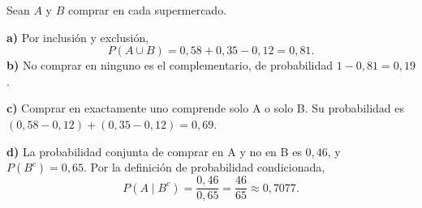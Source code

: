 Sean $A$ y $B$ comprar en cada supermercado.

\textbf{a)} Por inclusión y exclusión,
\[
 P(A\cup B)=0{,}58+0{,}35-0{,}12=\boxed{0{,}81}.
\]
\textbf{b)} No comprar en ninguno es el complementario, de probabilidad $1-0{,}81=\boxed{0{,}19}$.

\textbf{c)} Comprar en exactamente uno comprende solo A o solo B. Su probabilidad es $(0{,}58-0{,}12)+(0{,}35-0{,}12)=\boxed{0{,}69}$.

\textbf{d)} La probabilidad conjunta de comprar en A y no en B es $0{,}46$, y $P(B^c)=0{,}65$. Por la definición de probabilidad condicionada,
\[
 P(A\mid B^c)=\frac{0{,}46}{0{,}65}=\boxed{\frac{46}{65}}\approx0{,}7077.
\]

